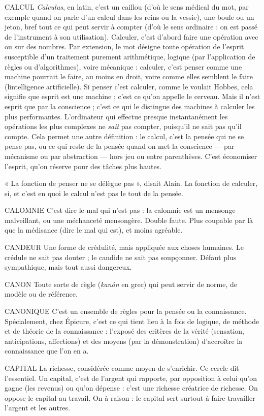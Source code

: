 CALCUL {\it Calculus}, en latin, c’est un caillou (d’où le sens médical du mot, par
exemple quand on parle d’un calcul dans les reins ou la vessie), une
boule ou un jeton, bref tout ce qui peut servir à compter (d’où le sens
ordinaire : on est passé de l'instrument à son utilisation). Calculer, c’est
d’abord faire une opération avec ou sur des nombres. Par extension, le mot
désigne toute opération de l'esprit susceptible d’un traitement purement arithmétique,
logique (par l'application de règles ou d’algorithmes), voire mécanique :
calculer, c’est penser comme une machine pourrait le faire, au moins en
droit, voire comme elles semblent le faire (lintelligence artificielle). Si penser
c’est calculer, comme le voulait Hobbes, cela signifie que esprit est une
machine ; c’est ce qu’on appelle le cerveau. Mais il n’est esprit que par la
conscience ; c’est ce qui le distingue des machines à calculer les plus performantes.
L'ordinateur qui effectue presque instantanément les opérations les
plus complexes ne {\it sait} pas compter, puisqu'il ne sait pas qu’il compte. Cela
permet une autre définition : le calcul, c’est la pensée qui ne se pense pas, ou ce
qui reste de la pensée quand on met la conscience — par mécanisme ou par abstraction —
hors jeu ou entre parenthèses. C’est économiser l'esprit, qu’on
réserve pour des tâches plus hautes.

« La fonction de penser ne se délègue pas », disait Alain. La fonction de calculer,
si, et c’est en quoi le calcul n’est pas le tout de la pensée.

CALOMNIE C'est dire le mal qui n’est pas : la calomnie est un mensonge
malveillant, ou une méchanceté mensongère. Double faute.
Plus coupable par là que la médisance (dire le mal qui est), et moins agréable.

CANDEUR Une forme de crédulité, mais appliquée aux choses humaines. Le
crédule ne sait pas douter ; le candide ne sait pas soupçonner.
Défaut plus sympathique, mais tout aussi dangereux.

CANON Toute sorte de règle ({\it kanôn} en grec) qui peut servir de norme, de
modèle ou de référence.

CANONIQUE C’est un ensemble de règles pour la pensée ou la connaissance.
Spécialement, chez Épicure, c’est ce qui tient lieu à la
fois de logique, de méthode et de théorie de la connaissance : l’exposé des critères
de la vérité (sensation, anticipations, affections) et des moyens (par la
démonstration) d’accroître la connaissance que l’on en a.

CAPITAL La richesse, considérée comme moyen de s'enrichir. Ce cercle dit
l'essentiel. Un capital, c’est de l’argent qui rapporte, par opposition
à celui qu'on gagne (les revenus) ou qu’on dépense : c’est une richesse
créatrice de richesse.
On oppose le capital au travail. On à raison : le capital sert surtout à faire
travailler l’argent et les autres.

